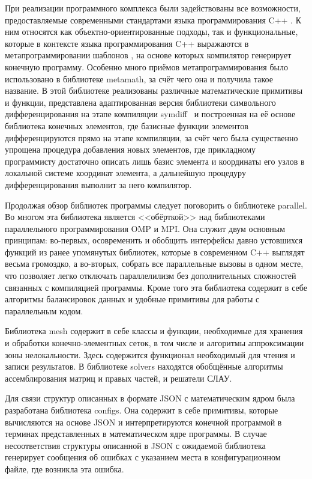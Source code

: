 При реализации программного комплекса были задействованы все возможности, предоставляемые современными стандартами языка программирования C++ \cite{CppReference}. К ним относятся как объектно-ориентированные подходы, так и функциональные, которые в контексте языка программирования C++ выражаются в метапрограммировании шаблонов \cite{Alexandresku, Vandevoorde}, на основе которых компилятор генерирует конечную программу. Особенно много приёмов метапрограммирования было использовано в библиотеке metamath, за счёт чего она и получила такое название. В этой библиотеке реализованы различные математические примитивы и функции, представлена адаптированная версия библиотеки символьного дифференцирования на этапе компиляции \mbox{symdiff \cite{KrasnovMeta}} и построенная на её основе библиотека конечных элементов, где базисные функции элементов дифференцируются прямо на этапе компиляции, за счёт чего была существенно упрощена процедура добавления новых элементов, где прикладному программисту достаточно описать лишь базис элемента и координаты его узлов в локальной системе координат элемента, а дальнейшую процедуру дифференцирования выполнит за него компилятор.

Продолжая обзор библиотек программы следует поговорить о библиотеке parallel. Во многом эта библиотека является <<обёрткой>> над библиотеками параллельного программирования OMP и MPI. Она служит двум основным принципам: во-первых, осовременить и обобщить интерфейсы давно устовшихся функций из ранее упомянутых библиотек, которые в современном C++ выглядят весьма громоздко, а во-вторых, собрать все параллельные вызовы в одном месте, что позволяет легко отключать параллелилизм без дополнительных сложностей связанных с компиляцией программы. Кроме того эта библиотека содержит в себе алгоритмы балансировок данных и удобные примитивы для работы с параллельным кодом.

Библиотека mesh содержит в себе классы и функции, необходимые для хранения и обработки конечно-элементных сеток, в том числе и алгоритмы аппроксимации зоны нелокальности. Здесь содержится функционал необходимый для чтения и записи результатов. В библиотеке solvers находятся обобщённые алгоритмы ассемблирования матриц и правых частей, и решатели СЛАУ.

Для связи структур описанных в формате JSON с математическим ядром была разработана библиотека configs. Она содержит в себе примитивы, которые вычисляются на основе JSON и интерпретируются конечной программой в терминах представленных в математическом ядре программы. В случае несоответствия структуры описанной в JSON с ожидаемой библиотека генерирует сообщения об ошибках с указанием места в конфигурационном файле, где возникла эта ошибка.

